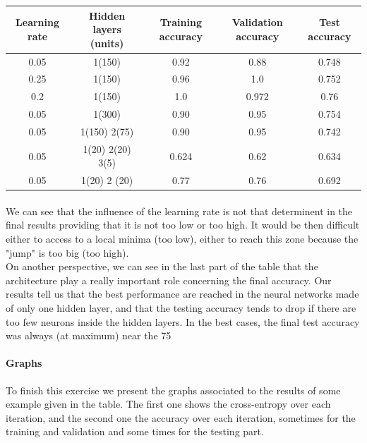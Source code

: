 \documentclass[a4paper]{report}
\begin{document}
\begin{center}
\begin{tabular}{||c|c|c|c|c||}
\hline
 Learning rate & Hidden layers (units) & Training accuracy & Validation accuracy & Test accuracy  \\ [0.5ex]
\hline
\hline
0.05&1(150)&0.92&0.88&0.748\\
\hline
0.25&1(150)&0.96&1.0&0.752\\
\hline
0.2&1(150)&1.0&0.972&0.76\\
\hline
0.05&1(300)&0.90&0.95&0.754\\
\hline
0.05&1(150) 2(75)&0.90&0.95&0.742\\
\hline
0.05&1(20) 2(20) 3(5)&0.624&0.62&0.634\\
\hline
0.05&1(20) 2 (20)&0.77&0.76&0.692\\
\hline
\end{tabular}
\end{center}

\paragraph{} We can see that the influence of the learning rate is not that determinent in the final results providing that it is not too low or too high. It would be then difficult either to access to a local minima (too low), either to reach this zone because the "jump" is too big (too high).
\\On another perspective, we can see in the last part of the table that the architecture play a really important role concerning the final accuracy. Our results tell us that the best performance are reached in the neural networks made of only one hidden layer, and that the testing accuracy tends to drop if there are too few neurons inside the hidden layers. In the best cases, the final test accuracy was always (at maximum) near the 75%

\paragraph{Graphs}
To finish this exercise we present the graphs associated to the results of some example given in the table. The first one shows the cross-entropy over each iteration, and the second one the accuracy over each iteration, sometimes for the training and validation and some times for the testing part.
\end{document}
